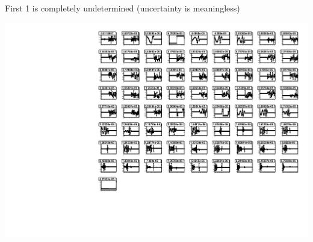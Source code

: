 \documentclass[compress]{beamer}
\begin{document}
\begin{frame}
{First 1 is completely undetermined (uncertainty is meaningless)

\includegraphics[width=0.9\linewidth]{newplots_errors_YEm1_x.pdf}}
\end{frame}
\end{document}
